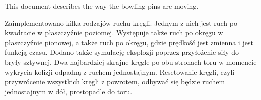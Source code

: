 This document describes the way the bowling pins are moving.

Zaimplementowano kilka rodzajów ruchu kręgli. Jednym z nich jest ruch po kwadracie w płaszczyźnie poziomej. Występuje także ruch po okręgu w płaszczyźnie pionowej, a także ruch po okręgu, gdzie prędkość jest zmienna i jest funkcją czasu. Dodano także symulację eksplozji poprzez przyłożenie siły do bryły sztywnej. Dwa najbardziej skrajne kręgle po obu stronach toru w momencie wykrycia kolizji odpadną z ruchem jednostajnym. Resetowanie kręgli, czyli przywrócenie wszystkich kręgli z powrotem, odbywać się będzie ruchem jednostajnym w dół, prostopadle do toru. 